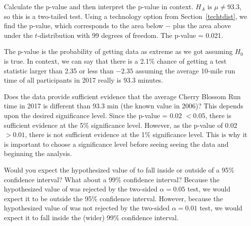\begin{examplewrap}
\begin{nexample}{Calculate the p-value and then interpret the p-value in context.  }
$H_A$ is $\mu \ne 93.3$, so this is a two-tailed test.  Using a technology option from Section~\ref{techtdist}, we find the p-value, which corresponds to the area below $-$\cherryblossomt{} plus the area above \cherryblossomt{} under the $t$-distribution with 99 degrees of freedom.  The p-value = 0.021.
\begin{center}
\end{center}
The p-value is the probability of getting data as extreme as we got assuming $H_0$ is true.  In context, we can say that there is a 2.1\% chance of getting a test statistic larger than 2.35 or less than $-2.35$ assuming the average 10-mile run time of all participants in 2017 really is 93.3 minutes.
\end{nexample}
\end{examplewrap}


\begin{examplewrap}
\begin{nexample}{Does the data provide sufficient evidence that the average Cherry Blossom Run time in 2017 is different than 93.3 min (the known value in 2006)?}
This depends upon the desired significance level.  Since the p-value = 0.02 $< 0.05$, there is sufficient evidence at the 5\% significance level.  However, as the p-value of 0.02 $> 0.01$, there is not sufficient evidence at the 1\% significance level.  This is why it is important to choose a significance level before seeing seeing the data and beginning the analysis.
\end{nexample}
\end{examplewrap}


\begin{examplewrap}
\begin{nexample}{Would you expect the hypothesized value of \cherryblossomnull{} to fall inside or outside of a 95\% confidence interval?  What about a 99\% confidence interval?} 
Because the hypothesized value of \cherryblossomnull{} was rejected by the two-sided $\alpha=0.05$ test, we would expect it to be outside the 95\% confidence interval.  However, because the hypothesized value of \cherryblossomnull{} was not rejected by the two-sided $\alpha=0.01$ test, we would expect it to fall inside the (wider) 99\% confidence interval.  
\end{nexample}
\end{examplewrap}


